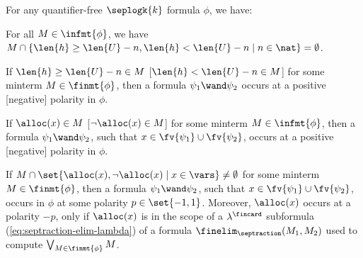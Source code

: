 \begin{lemma}\label{lemma:polarity}
For any quantifier-free $\seplogk{k}$ formula $\phi$, we have:\begin{compactenum}
\item\label{it:polarity0} For all $M \in \infmt{\phi}$, we have \(M
  \cap \{\len{h} \geq \len{U}-n, \len{h} < \len{U}-n \mid n \in
    \nat\} = \emptyset\).
\item\label{it:polarity1} If $\len{h} \geq \len{U}-n \in M$ [$\len{h}
  < \len{U}-n \in M$] for some minterm $M \in \finmt{\phi}$, then a
  formula $\psi_1 \wand \psi_2$ occurs at a positive [negative] polarity
  in $\phi$.
\item\label{it:polarity2} If $\alloc(x) \in M$ [$\neg\alloc(x) \in M$]
  for some minterm $M \in \infmt{\phi}$, then a formula $\psi_1 \wand
  \psi_2$, such that $x \in \fv{\psi_1} \cup \fv{\psi_2}$, occurs at a
  positive [negative] polarity in $\phi$.
\item\label{it:polarity3} If $M \cap \set{\alloc(x),\neg\alloc(x) \mid
  x \in \vars} \neq \emptyset$ for some minterm $M \in \finmt{\phi}$,
  then a formula $\psi_1 \wand \psi_2$, such that $x \in \fv{\psi_1}
  \cup \fv{\psi_2}$, occurs in $\phi$ at some polarity $p \in
  \set{-1,1}$. Moreover, $\alloc(x)$ occurs at a polarity $-p$, only if
  $\alloc(x)$ is in the scope of a $\lambda^\fincard$ subformula
  (\ref{eq:septraction-elim-lambda}) of a formula
  $\finelim_{\septraction}(M_1,M_2)$ used to compute
  $\bigvee_{M\in\finmt{\phi}} M$.  
\end{compactenum}
\end{lemma}
